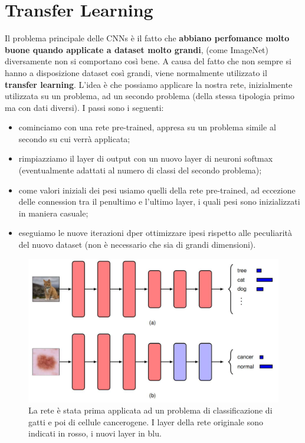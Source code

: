 \section{Transfer Learning}
Il problema principale delle CNNs è il fatto che \textbf{abbiano perfomance molto buone quando applicate a dataset molto grandi}, (come ImageNet) diversamente non si comportano così bene. A causa del fatto che non sempre si hanno a disposizione dataset così grandi, viene normalmente utilizzato il \textbf{transfer learning}. L'idea è che possiamo applicare la nostra rete, inizialmente utilizzata su un problema, ad un secondo problema (della stessa tipologia primo ma con dati diversi). I passi sono i seguenti:
\begin{itemize}
    \item cominciamo con una rete pre-trained, appresa su un problema simile al secondo su cui verrà applicata;
    \item rimpiazziamo il layer di output con un nuovo layer di neuroni softmax (eventualmente adattati al numero di classi del secondo problema);
    \item come valori iniziali dei pesi usiamo quelli della rete pre-trained, ad eccezione delle connession tra il penultimo e l'ultimo layer, i quali pesi sono inizializzati in maniera casuale;
    \item eseguiamo le nuove iterazioni dper ottimizzare ipesi rispetto alle peculiarità del nuovo dataset (non è necessario che sia di grandi dimensioni).
\end{itemize}
\begin{figure}[!h]
    \includegraphics[scale=.5]{images/cnn/transf_learning.png}
    \caption{La rete è stata prima applicata ad un problema di classificazione di gatti e poi di cellule cancerogene. I layer della rete originale sono indicati in rosso, i nuovi layer in blu.}
    \centering
\end{figure}


